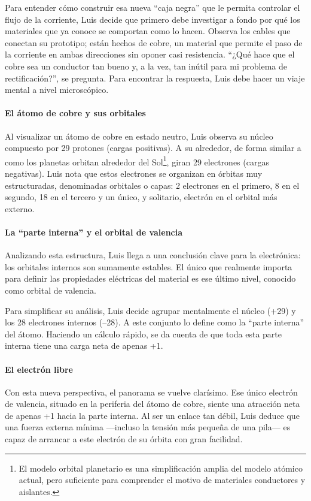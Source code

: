 Para entender cómo construir esa nueva ``caja negra'' que le permita controlar el flujo de la corriente, Luis decide que primero debe investigar a fondo por qué los materiales que ya conoce se comportan como lo hacen. Observa los cables que conectan su prototipo; están hechos de cobre, un material que permite el paso de la corriente en ambas direcciones sin oponer casi resistencia. ``¿Qué hace que el cobre sea un conductor tan bueno y, a la vez, tan inútil para mi problema de rectificación?'', se pregunta. Para encontrar la respuesta, Luis debe hacer un viaje mental a nivel microscópico.

\paragraph{El átomo de cobre y sus orbitales}
Al visualizar un átomo de cobre en estado neutro, Luis observa su núcleo compuesto por 29 protones (cargas positivas). A su alrededor, de forma similar a como los planetas orbitan alrededor del Sol\footnote{El modelo orbital planetario es una simplificación amplia del modelo atómico actual, pero suficiente para comprender el motivo de materiales conductores y aislantes.}, giran 29 electrones (cargas negativas). Luis nota que estos electrones se organizan en órbitas muy estructuradas, denominadas orbitales o capas: 2 electrones en el primero, 8 en el segundo, 18 en el tercero y un único, y solitario, electrón en el orbital más externo.

\paragraph{La ``parte interna'' y el orbital de valencia}
Analizando esta estructura, Luis llega a una conclusión clave para la electrónica: los orbitales internos son sumamente estables. El único que realmente importa para definir las propiedades eléctricas del material es ese último nivel, conocido como orbital de valencia.

Para simplificar su análisis, Luis decide agrupar mentalmente el núcleo (+29) y los 28 electrones internos (--28). A este conjunto lo define como la ``parte interna'' del átomo. Haciendo un cálculo rápido, se da cuenta de que toda esta parte interna tiene una carga neta de apenas +1.

\paragraph{El electrón libre}
Con esta nueva perspectiva, el panorama se vuelve clarísimo. Ese único electrón de valencia, situado en la periferia del átomo de cobre, siente una atracción neta de apenas +1 hacia la parte interna. Al ser un enlace tan débil, Luis deduce que una fuerza externa mínima —incluso la tensión más pequeña de una pila— es capaz de arrancar a este electrón de su órbita con gran facilidad.

